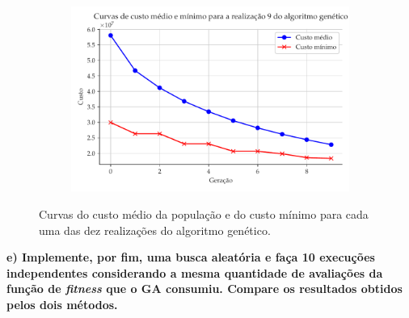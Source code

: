 \documentclass[a4paper, 12pt]{article}
\begin{document}
\begin{figure}[!ht]
\begin{subfigure}{0.4\textwidth}
\end{subfigure}
\begin{subfigure}{0.4\textwidth}
    \includegraphics[width=\textwidth]{figuras/realizacao-9.pdf}
\end{subfigure}
\hfill
\caption{Curvas do custo médio da população e do custo mínimo para cada uma das dez realizações do algoritmo genético.}
\label{fig:curvas}
\end{figure}

\textbf{e) Implemente, por fim, uma busca aleatória e faça 10 execuções independentes considerando a mesma quantidade de avaliações da função de \textit{fitness} que o GA consumiu. Compare os resultados obtidos pelos dois métodos.}
\end{document}
